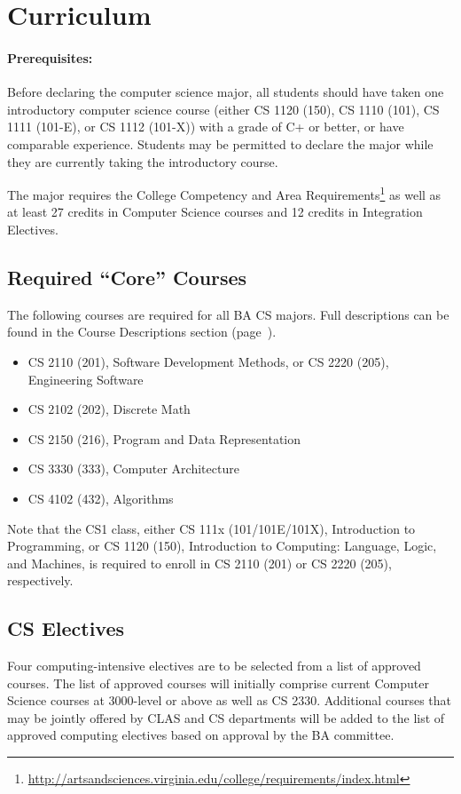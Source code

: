 \documentclass[10pt,letter]{book}
\newenvironment{itemlist}{
\begin{itemize}
\setlength{\itemsep}{0pt}
\setlength{\parskip}{0pt}}
{\end{itemize}}
\newcommand{\mysection}[1]{\section{#1}\renewcommand{\rightmark}{#1}}
\newcommand{\myurl}[1]{\footnote{\scriptsize\url{#1}}}
\begin{document}
\mysection{Curriculum}

\paragraph{Prerequisites:}

Before declaring the computer science major, all students should have
taken one introductory computer science course (either CS 1120 (150),
CS 1110 (101), CS 1111 (101-E), or CS 1112 (101-X)) with a grade of C+
or better, or have comparable experience. Students may be permitted to
declare the major while they are currently taking the introductory
course.

The major requires the College Competency and Area
Requirements\myurl{http://artsandsciences.virginia.edu/college/requirements/index.html}
as well as at least 27 credits in Computer Science courses and 12
credits in Integration Electives.

\subsection{Required ``Core'' Courses}

The following courses are required for all BA CS majors.  Full
descriptions can be found in the Course Descriptions section
(page~\pageref{sec:coursedesc}).

\begin{itemlist}
\item CS 2110 (201), Software Development Methods, or CS 2220 (205),
  Engineering Software
\item CS 2102 (202), Discrete Math
\item CS 2150 (216), Program and Data Representation
\item CS 3330 (333), Computer Architecture
\item CS 4102 (432), Algorithms
\end{itemlist}

Note that the CS1 class, either CS 111x (101/101E/101X), Introduction
to Programming, or CS 1120 (150), Introduction to Computing: Language,
Logic, and Machines, is required to enroll in CS 2110 (201) or CS
2220 (205), respectively.

\subsection{CS Electives}

Four computing-intensive electives are to be selected from a list of
approved courses. The list of approved courses will initially comprise
current Computer Science courses at 3000-level or above as well as CS
2330. Additional courses that may be jointly offered by CLAS and CS
departments will be added to the list of approved computing electives
based on approval by the BA committee.
\end{document}
